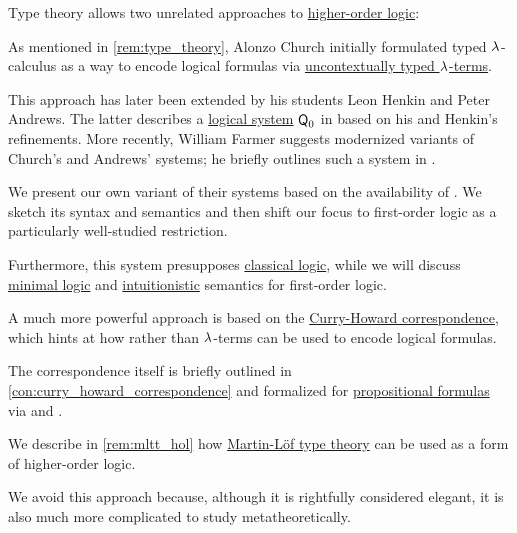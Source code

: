 \begin{remark}\label{rem:higher_order_logic_and_type_theory}
  Type theory allows two unrelated approaches to \hyperref[rem:predicate_logic]{higher-order logic}:
  \begin{thmenum}
     As mentioned in \cref{rem:type_theory}, Alonzo Church initially formulated typed \( {\mathrm \lambda} \)-calculus as a way to encode logical formulas via \hyperref[def:typed_lambda_term]{uncontextually typed \( {\mathrm \lambda} \)-terms}.

    This approach has later been extended by his students Leon Henkin and Peter Andrews. The latter describes a \hyperref[con:logical_system]{logical system} \( \textsf{Q}_0 \) in \cite[ch. 5]{Andrews2002Logic} based on his and Henkin's refinements. More recently, William Farmer suggests modernized variants of Church's and Andrews' systems; he briefly outlines such a system in \cite{Farmer2008STTVirtues}.

    We present our own variant of their systems based on the availability of . We sketch its syntax and semantics and then shift our focus to first-order logic as a particularly well-studied restriction.

    Furthermore, this system presupposes \hyperref[con:classical_logic]{classical logic}, while we will discuss \hyperref[con:minimal_logic]{minimal logic} and \hyperref[con:intuitionistic_logic]{intuitionistic} semantics for first-order logic.

     A much more powerful approach is based on the \hyperref[con:curry_howard_correspondence]{Curry-Howard correspondence}, which hints at how  rather than \( {\mathrm \lambda} \)-terms can be used to encode logical formulas.

    The correspondence itself is briefly outlined in \cref{con:curry_howard_correspondence} and formalized for \hyperref[def:propositional_syntax/formula]{propositional formulas} via  and .

    We describe in \cref{rem:mltt_hol} how \hyperref[def:mltt]{Martin-L\"of type theory} can be used as a form of higher-order logic.

    We avoid this approach because, although it is rightfully considered elegant, it is also much more complicated to study metatheoretically.
  \end{thmenum}
\end{remark}

